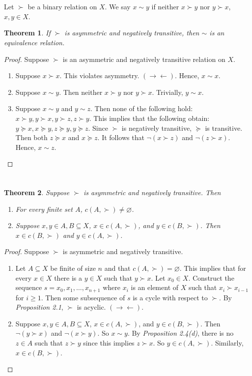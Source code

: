 \documentclass[12pt]{article}
\newtheorem{thm}{Theorem}[section]
\theoremstyle{definition}
\theoremstyle{remark}
\def\contra{\rightarrow \leftarrow}
\def\empty{\varnothing}
\begin{document}
\section{}
Let $\succ$ be a binary relation on $X$. We say $x \sim y$ if neither $x \succ y$ nor $y \succ x$, $x,y \in X$.
\begin{thm}
  If $\succ$ is asymmetric and negatively transitive, then $\sim$ is an equivalence relation.
\end{thm}
\begin{proof}
  Suppose $\succ$ is an asymmetric and negatively transitive relation on $X$.
  \begin{enumerate}
    \item Suppose $x \succ x$. This violates asymmetry. $(\contra)$. Hence, $x \sim x$.
    \item Suppose $x \sim y$. Then neither $x \succ y$ nor $y \succ x$. Trivially, $y \sim x$.
    \item Suppose $x \sim y$ and $y \sim z$. Then none of the following hold: $x \succ y, y \succ x, y \succ z, z \succ y$. This implies that the following obtain: $y \succeq x, x \succeq y, z \succeq y, y \succeq z$. Since $\succ$ is negatively transitive, $\succeq$ is transitive. Then both $z \succeq x$ and $x \succeq z$. It follows that $\neg(x \succ z)$ and $\neg(z \succ x)$. Hence, $x \sim z$.
  \end{enumerate}
\end{proof}
%
%
\section{}
\begin{thm}
  Suppose $\succ$ is asymmetric and negatively transitive. Then
  \begin{enumerate}
    \item For every finite set $A$, $c(A,\succ) \neq \empty$.
    \item Suppose $x,y \in A,B \subseteq X$, $x \in c(A, \succ)$, and $y \in c(B, \succ)$. Then $x \in c(B, \succ)$ and $y \in c(A, \succ)$.
  \end{enumerate}
\end{thm}
\begin{proof}
  Suppose $\succ$ is asymmetric and negatively transitive.
  \begin{enumerate}
    \item Let $A \subseteq X$ be finite of size $n$ and that $c(A, \succ) = \empty$. This implies that for every $x \in X$ there is a $y \in X$ such that $y \succ x$. Let $x_0 \in X$. Construct the sequence $s = x_0, x_1, \ldots, x_{n+1}$ where $x_i$ is an element of $X$ such that $x_i \succ x_{i-1}$ for $i \geq 1$. Then some subsequence of $s$ is a cycle with respect to $\succ$.
    By \emph{Proposition 2.1}, $\succ$ is acyclic. $(\contra)$.
    \item Suppose $x,y \in A,B \subseteq X$, $x \in c(A, \succ)$, and $y \in c(B, \succ)$. Then $\neg(y \succ x)$ and $\neg(x \succ y)$. So $x \sim y$. By \emph{Proposition 2.4(d)}, there is no $z \in A$ such that $z \succ y$ since this implies $z \succ x$. So $y \in c(A, \succ)$. Similarly, $x \in c(B, \succ)$.
  \end{enumerate}
\end{proof}
%
%
\end{document}
